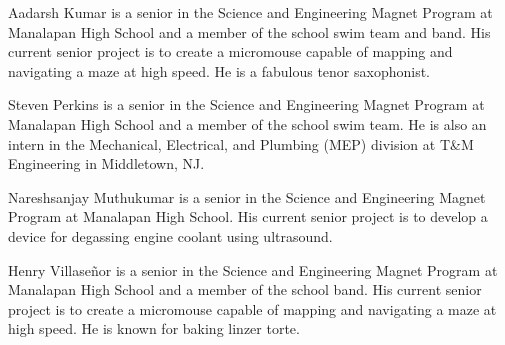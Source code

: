 ﻿\documentclass[10pt,journal,twoside]{IEEEtran}
\begin{document}
\begin{IEEEbiography}{Aadarsh Kumar} is a senior in the Science and Engineering Magnet Program at Manalapan High School and a member of the school swim team and band. His current senior project is to create a micromouse capable of mapping and navigating a maze at high speed. He is a fabulous tenor saxophonist. 
\end{IEEEbiography}
\begin{IEEEbiography}{Steven Perkins} is a senior in the Science and Engineering Magnet Program at Manalapan High School and a member of the school swim team. He is also an intern in the Mechanical, Electrical, and Plumbing (MEP)  division at T\&M Engineering in Middletown, NJ.
\end{IEEEbiography}
\begin{IEEEbiography}{Nareshsanjay Muthukumar} is a senior in the Science and Engineering Magnet Program at Manalapan High School. His current senior project is to develop a device for degassing engine coolant using ultrasound. 
\end{IEEEbiography}
\vfill
\newpage
\begin{IEEEbiography}{Henry Villase\~{n}or} is a senior in the Science and Engineering Magnet Program at Manalapan High School and a member of the school band. His current senior project is to create a micromouse capable of mapping and navigating a maze at high speed. He is known for baking linzer torte. 
\end{IEEEbiography}
\end{document}
